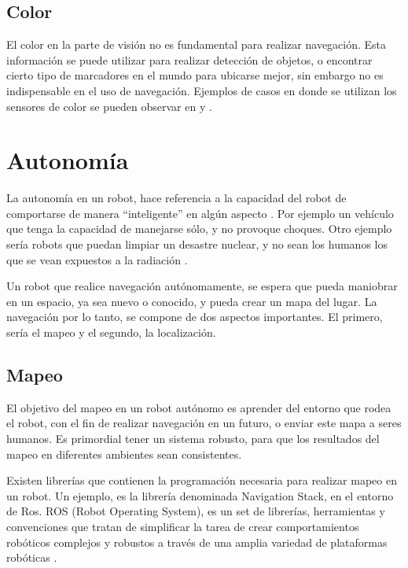 \subsection{Color}

El color en la parte de visión no es fundamental para realizar navegación. Esta información se puede utilizar para realizar detección de objetos, o encontrar cierto tipo de marcadores en el mundo para ubicarse mejor, sin embargo no es indispensable en el uso de navegación. Ejemplos de casos en donde se utilizan los sensores de color se pueden observar en \cite{Manduchi2005} y \cite{Lai2011}.


\section{Autonomía}

La autonomía en un robot, hace referencia a la capacidad del robot de comportarse de manera ``inteligente'' en algún aspecto \cite{Thrun2005}. Por ejemplo un vehículo que tenga la capacidad de manejarse sólo, y no provoque choques. Otro ejemplo sería robots que puedan limpiar un desastre nuclear, y no sean los humanos los que se vean expuestos a la radiación \cite{Thrun2005}.

Un robot que realice navegación autónomamente, se espera que pueda maniobrar en un espacio, ya sea nuevo o conocido, y pueda crear un mapa del lugar. La navegación por lo tanto, se compone de dos aspectos importantes. El primero, sería el mapeo y el segundo, la localización.

\subsection{Mapeo}

El objetivo del mapeo en un robot autónomo es aprender del entorno que rodea el robot, con el fin de realizar navegación en un futuro, o enviar este mapa a seres humanos. Es primordial tener un sistema robusto, para que los resultados del mapeo en diferentes ambientes sean consistentes.

Existen librerías que contienen la programación necesaria para realizar mapeo en un robot. Un ejemplo, es la librería denominada Navigation Stack, en el entorno de Ros. ROS (Robot Operating System), es un set de librerías, herramientas y convenciones que tratan de simplificar la tarea de crear comportamientos robóticos complejos y robustos a través de una amplia variedad de plataformas robóticas \cite{Quigley2009}.


